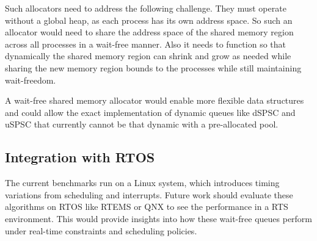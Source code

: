 Such allocators need to address the following challenge. They must operate without a global heap, as each process has its own address space. So such an allocator would need to share the address space of the shared memory region across all processes in a wait-free manner. Also it needs to function so that dynamically the shared memory region can shrink and grow as needed while sharing the new memory region bounds to the processes while still maintaining wait-freedom.

A wait-free shared memory allocator would enable more flexible data structures and could allow the exact implementation of dynamic queues like \ac{dSPSC} and \ac{uSPSC} that currently cannot be that dynamic with a pre-allocated pool.

\subsection{Integration with \acf{RTOS}}
The current benchmarks run on a Linux system, which introduces timing variations from scheduling and interrupts. Future work should evaluate these algorithms on \ac{RTOS} like RTEMS or QNX to see the performance in a \ac{RTS} environment. This would provide insights into how these wait-free queues perform under real-time constraints and scheduling policies.